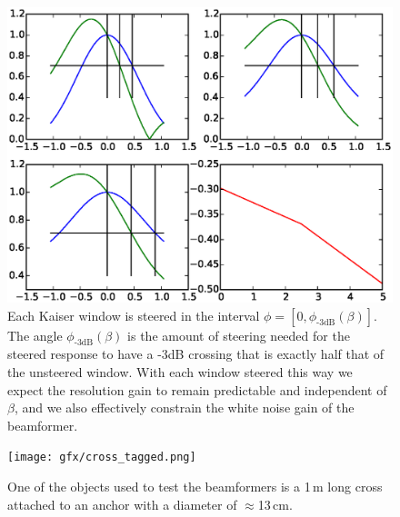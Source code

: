 \documentclass[10pt,journal,draftclsnofoot,onecolumn]{IEEEtran}
\let\MYoriglatexcaption\caption               %
\renewcommand{\caption}[2][\relax]{\MYoriglatexcaption[#2]{#2}}
\newcommand\1{\vec 1}
\begin{document}
\begin{figure}[tbp]%
\includegraphics[width=\linewidth]{gfx/calc_kaiser_3dB.eps}%
\caption{Each Kaiser window is steered in the interval $\phi=[0, \phi_{\text{-3dB}}(\beta)]$. The angle $\phi_{\text{-3dB}}(\beta)$ is the amount of steering needed for the steered response to have a -3dB crossing that is exactly half that of the unsteered window. With each window steered this way we expect the resolution gain to remain predictable and independent of $\beta$, and we also effectively constrain the white noise gain of the beamformer.}\label{windows_steering}
\end{figure}

\begin{figure}[tbp]%
\texttt{[image: gfx/cross\_tagged.png]}%
\caption{One of the objects used to test the beamformers is a 1\,m long cross attached to an anchor with a diameter of $\approx$13\,cm.}\label{cross}
\end{figure}

\setcounter{topnumber}{1}
\setcounter{dbltopnumber}{1}
\end{document}
